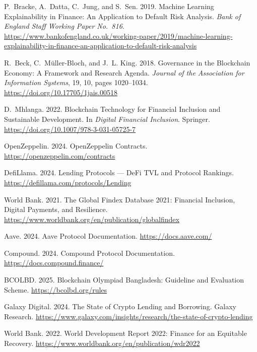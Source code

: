 \documentclass[12pt, a4paper]{report}
\begin{document}
{\begin{enumerate}[label={[\arabic*]}]
\item P.~Bracke, A.~Datta, C.~Jung, and S.~Sen. 2019. Machine Learning Explainability in Finance: An Application to Default Risk Analysis. \emph{Bank of England Staff Working Paper No.~816}. \url{https://www.bankofengland.co.uk/working-paper/2019/machine-learning-explainability-in-finance-an-application-to-default-risk-analysis}

\item R.~Beck, C.~M\"{u}ller-Bloch, and J.~L. King. 2018. Governance in the Blockchain Economy: A Framework and Research Agenda. \emph{Journal of the Association for Information Systems}, 19, 10, pages 1020--1034. \url{https://doi.org/10.17705/1jais.00518}

\item D.~Mhlanga. 2022. Blockchain Technology for Financial Inclusion and Sustainable Development. In \emph{Digital Financial Inclusion}. Springer. \url{https://doi.org/10.1007/978-3-031-05725-7}

\item OpenZeppelin. 2024. OpenZeppelin Contracts. \url{https://openzeppelin.com/contracts}

\item DefiLlama. 2024. Lending Protocols --- DeFi TVL and Protocol Rankings. \url{https://defillama.com/protocols/Lending}

\item World Bank. 2021. The Global Findex Database 2021: Financial Inclusion, Digital Payments, and Resilience. \url{https://www.worldbank.org/en/publication/globalfindex}

\item Aave. 2024. Aave Protocol Documentation. \url{https://docs.aave.com/}

\item Compound. 2024. Compound Protocol Documentation. \url{https://docs.compound.finance/}

\item BCOLBD. 2025. Blockchain Olympiad Bangladesh: Guideline and Evaluation Scheme. \url{https://bcolbd.org/rules}

\item Galaxy Digital. 2024. The State of Crypto Lending and Borrowing. Galaxy Research. \url{https://www.galaxy.com/insights/research/the-state-of-crypto-lending}

\item World Bank. 2022. World Development Report 2022: Finance for an Equitable Recovery. \url{https://www.worldbank.org/en/publication/wdr2022}


\end{enumerate}}
\end{document}
